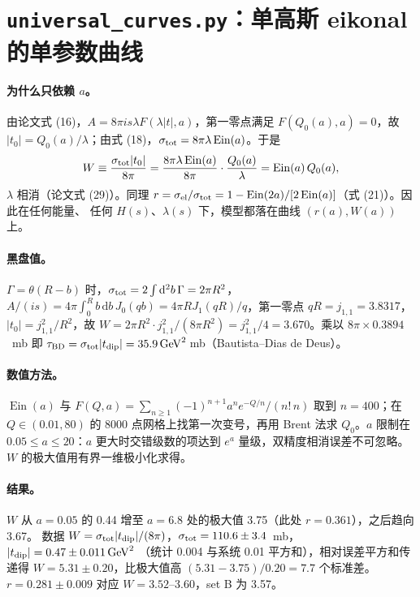 \documentclass[11pt,a4paper]{ctexart}
\newcommand{\dd}{\mathrm d}
\newcommand{\Ein}{\operatorname{Ein}}
\newcommand{\GeVt}{\,\mathrm{GeV}^2}
\begin{document}
\section{\texttt{universal\_curves.py}：单高斯 eikonal 的单参数曲线}

\paragraph{为什么只依赖 $a$。}由论文式 (16)，$A=8\pi is\lambda F(\lambda|t|,a)$，第一零点满足
$F(Q_0(a),a)=0$，故 $|t_0|=Q_0(a)/\lambda$；由式 (18)，$\sigma_{\rm tot}=8\pi\lambda\Ein(a)$。于是
\begin{equation}
W\equiv\frac{\sigma_{\rm tot}|t_0|}{8\pi}=\frac{8\pi\lambda\Ein(a)}{8\pi}\cdot\frac{Q_0(a)}{\lambda}=\Ein(a)\,Q_0(a),
\end{equation}
$\lambda$ 相消（论文式 (29)）。同理 $r=\sigma_{\rm el}/\sigma_{\rm tot}=1-\Ein(2a)/[2\Ein(a)]$（式 (21)）。因此在任何能量、
任何 $H(s)$、$\lambda(s)$ 下，模型都落在曲线 $(r(a),W(a))$ 上。

\paragraph{黑盘值。}$\Gamma=\theta(R-b)$ 时，$\sigma_{\rm tot}=2\int\dd^2b\,\Gamma=2\pi R^2$，
$A/(is)=4\pi\int_0^Rb\,\dd b\,J_0(qb)=4\pi RJ_1(qR)/q$，第一零点 $qR=j_{1,1}=3.8317$，$|t_0|=j_{1,1}^2/R^2$，故
$W=2\pi R^2\cdot j_{1,1}^2/(8\pi R^2)=j_{1,1}^2/4=3.670$。乘以 $8\pi\times0.3894$~mb 即
$\tau_{\rm BD}=\sigma_{\rm tot}|t_{\rm dip}|=35.9\GeVt$\,mb（Bautista--Dias de Deus）。

\paragraph{数值方法。}$\Ein(a)$ 与 $F(Q,a)=\sum_{n\ge1}(-1)^{n+1}a^ne^{-Q/n}/(n!\,n)$ 取到 $n=400$；在 $Q\in(0.01,80)$
的 8000 点网格上找第一次变号，再用 Brent 法求 $Q_0$。$a$ 限制在 $0.05\le a\le20$：$a$ 更大时交错级数的项达到
$e^{a}$ 量级，双精度相消误差不可忽略。$W$ 的极大值用有界一维极小化求得。

\paragraph{结果。}$W$ 从 $a=0.05$ 的 0.44 增至 $a=6.8$ 处的极大值 3.75（此处 $r=0.361$），之后趋向 3.67。
数据 $W=\sigma_{\rm tot}|t_{\rm dip}|/(8\pi)$，$\sigma_{\rm tot}=110.6\pm3.4$~mb，$|t_{\rm dip}|=0.47\pm0.011\GeVt$
（统计 0.004 与系统 0.01 平方和），相对误差平方和传递得 $W=5.31\pm0.20$，比极大值高
$(5.31-3.75)/0.20=7.7$ 个标准差。$r=0.281\pm0.009$ 对应 $W=3.52$--3.60，set B 为 3.57。
\end{document}
